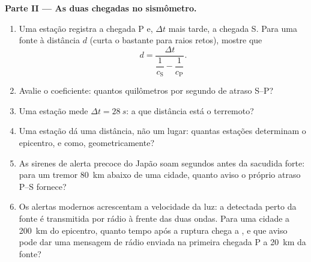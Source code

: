 \begin{problem}
\medskip\noindent\textbf{Parte II --- As duas chegadas no sismômetro.}
\begin{enumerate}[resume]
  \item Uma estação registra a chegada P e, $\Delta t$ mais tarde, a
        chegada S. Para uma fonte à distância $d$ (curta o bastante
        para raios retos), mostre que
        \[
        d = \frac{\Delta t}{\dfrac{1}{c_{\text{S}}} -
        \dfrac{1}{c_{\text{P}}}} .
        \]
  \item Avalie o coeficiente: quantos quilômetros por segundo de
        atraso S--P?
  \item Uma estação mede $\Delta t = \qty{28}{s}$: a que distância
        está o terremoto?
  \item Uma estação dá uma distância, não um lugar: quantas estações
        determinam o epicentro, e como, geometricamente?
  \item As sirenes de alerta precoce do Japão soam segundos antes da
        sacudida forte: para um tremor \qty{80}{km} abaixo de uma
        cidade, quanto aviso o próprio atraso P--S fornece?
  \item Os alertas modernos acrescentam a velocidade da luz: a 
        detectada perto da fonte é transmitida por rádio à frente das
        duas ondas. Para uma cidade a \qty{200}{km} do epicentro,
        quanto tempo após a ruptura chega a , e que aviso pode
        dar uma mensagem de rádio enviada na primeira chegada P a
        \qty{20}{km} da fonte?
\end{enumerate}


\end{problem}
